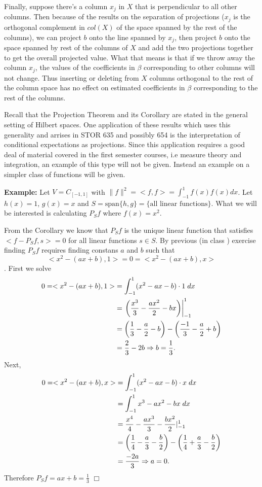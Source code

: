 \documentclass[12pt,oneside]{article}
\begin{document}
Finally, suppose there's a column $x_j$ in $X$ that is perpendicular to all
 other columns. Then because of the results on the separation of
 projections ($x_j$ is the orthogonal complement in $col(X)$ of the
 space spanned by the rest of the columns), we can project $b$ onto
 the line spanned by $x_j$, then project $b$ onto the space spanned by
 rest of the columns of $X$ and add the two projections together to
 get the overall projected value. What that means is that if we throw
 away the column $x_j$, the values of the coefficients in $\beta$
 corresponding to other columns will not change. Thus inserting or
 deleting from $X$ columns orthogonal to the rest of the column space
 has no effect on estimated coefficients in $\beta$ corresponding to
 the rest of the columns.
 
 Recall that the Projection Theorem and its Corollary are stated in the general setting of Hilbert spaces. One application of these results which uses this generality and arrises in STOR 635 and possibly 654 is the interpretation of conditional expectations as projections. Since this application requires a good deal of material covered in the first semester courses, i.e measure theory and integration, an example of this type will not be given. Instead an example on a simpler class of functions will be given.

\textbf{Example:} Let \(V=C_{[-1,1]}\) with \(\|f\|^2=<f,f>=\int_{-1}^1 f(x)f(x) dx\). Let \(h(x)=1\), \(g(x)=x\) and \(S=\text{span}\{h,g\}=\{\text{all linear functions}\}\). What we will be interested is calculating \(P_Sf\) where \(f(x)=x^2\).

From the Corollary we know that \(P_Sf\) is the unique linear function that satisfies \( <f-P_Sf,s>=0\) for all linear functions \(s\in S\). By previous (in class ) exercise finding \(P_Sf\) requires finding constans \(a\) and \(b\) such that
\[<x^2-(ax+b),1>=0=<x^2-(ax+b),x>\].
First we solve
\begin{align*}
0=<x^2-(ax+b),1>&=\int_{-1}^{1} (x^2-ax-b)\cdot 1 \hspace{1mm} dx\\
&=\left. \left(\frac{x^3}{3}-\frac{ax^2}{2}-bx\right)\right|_{-1}^{1}\\
&=\left(\frac{1}{3}-\frac{a}{2}-b\right)-\left(\frac{-1}{3}-\frac{a}{2}+b\right)\\
&=\frac{2}{3}-2b \Rightarrow b=\frac{1}{3}.
\end{align*}
Next, 
\begin{align*}
0=<x^2-(ax+b),x>&=\int_{-1}^{1} (x^2-ax-b)\cdot x\hspace{1mm} dx\\
&=\int_{-1}^{1}x^3-ax^2-bx \hspace{1mm}dx\\
&=\frac{x^4}{4}-\frac{ax^3}{3}-\frac{bx^2}{2}|_{-1}^{1}\\
&=\left(\frac{1}{4}-\frac{a}{3}-\frac{b}{2}\right)-\left(\frac{1}{4}+\frac{a}{3}-\frac{b}{2}\right)\\
&=\frac{-2a}{3} \Rightarrow a=0.
\end{align*}
Therefore \(P_Sf=ax+b=\frac{1}{3}\)  \(\Box\)\\
\end{document}
